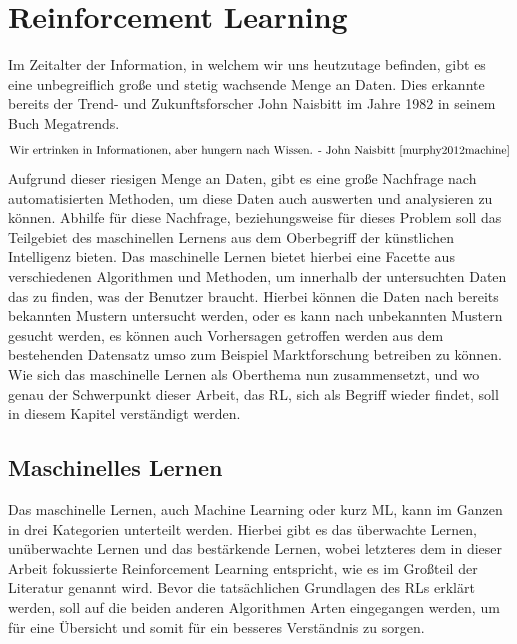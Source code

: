\documentclass[]{iat}
\begin{document}
\chapter{Reinforcement Learning} \label{sec:reinforcement_learning}
Im Zeitalter der Information, in welchem wir uns heutzutage befinden, gibt es eine unbegreiflich große und stetig wachsende Menge an Daten. Dies erkannte bereits der Trend- und Zukunftsforscher John Naisbitt im Jahre 1982 in seinem Buch Megatrends.
\begin{align*}
    \text{Wir ertrinken in Informationen, aber hungern nach Wissen. - John Naisbitt \cite[]{murphy2012machine}}
\end{align*}
Aufgrund dieser riesigen Menge an Daten, gibt es eine große Nachfrage nach automatisierten Methoden, um diese Daten auch auswerten und analysieren zu können. Abhilfe für diese Nachfrage, beziehungsweise für dieses Problem soll das Teilgebiet des maschinellen Lernens aus dem Oberbegriff der künstlichen Intelligenz bieten. Das maschinelle Lernen bietet hierbei eine Facette aus verschiedenen Algorithmen und Methoden, um innerhalb der untersuchten Daten das zu finden, was der Benutzer braucht. Hierbei können die Daten nach bereits bekannten Mustern untersucht werden, oder es kann nach unbekannten Mustern gesucht werden, es können auch Vorhersagen getroffen werden aus dem bestehenden Datensatz umso zum Beispiel Marktforschung betreiben zu können. Wie sich das maschinelle Lernen als Oberthema nun zusammensetzt, und wo genau der Schwerpunkt dieser Arbeit, das RL, sich als Begriff wieder findet, soll in diesem Kapitel verständigt werden.

\section{Maschinelles Lernen} \label{sec:machine_learning}
Das maschinelle Lernen, auch Machine Learning oder kurz ML, kann im Ganzen in drei Kategorien unterteilt werden. Hierbei gibt es das überwachte Lernen, unüberwachte Lernen und das bestärkende Lernen, wobei letzteres dem in dieser Arbeit fokussierte Reinforcement Learning entspricht, wie es im Großteil der Literatur genannt wird. \cite[]{Sutton1998} Bevor die tatsächlichen Grundlagen des RLs erklärt werden, soll auf die beiden anderen Algorithmen Arten eingegangen werden, um für eine Übersicht und somit für ein besseres Verständnis zu sorgen.
\end{document}
